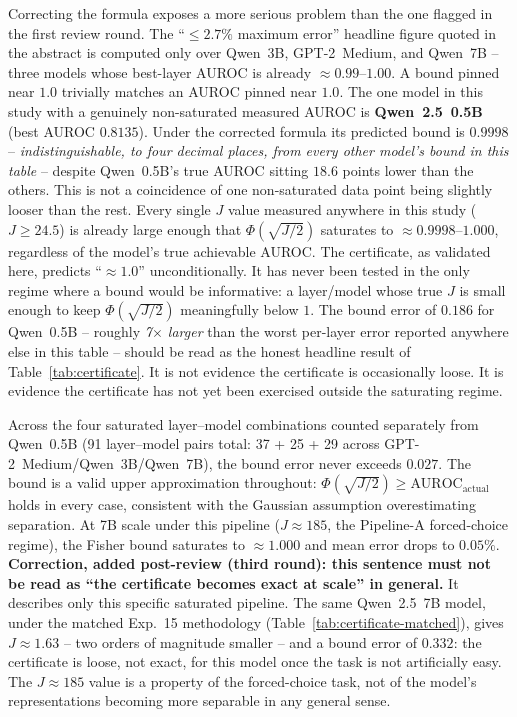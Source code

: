 \documentclass[onecolumn]{jmlr}
\begin{document}
Correcting the formula exposes a more serious problem than the one
flagged in the first review round. The ``$\leq 2.7\%$ maximum error''
headline figure quoted in the abstract is computed only over Qwen~3B,
GPT-2~Medium, and Qwen~7B -- three models whose best-layer AUROC is
already ${\approx}0.99$--$1.00$. A bound pinned near $1.0$ trivially
matches an AUROC pinned near $1.0$. The one model in this study with a
genuinely non-saturated measured AUROC is \textbf{Qwen~2.5~0.5B} (best
AUROC $0.8135$). Under the corrected formula its predicted bound is
$\mathbf{0.9998}$ -- \emph{indistinguishable, to four decimal places,
from every other model's bound in this table} -- despite Qwen~0.5B's
true AUROC sitting $18.6$ points lower than the others. This is not a
coincidence of one non-saturated data point being slightly looser than
the rest. Every single $J$ value measured anywhere in this study
($J \geq 24.5$) is already large enough that $\Phi(\sqrt{J/2})$
saturates to ${\approx}0.9998$--$1.000$, regardless of the model's true
achievable AUROC. The certificate, as validated here, predicts
``${\approx}1.0$'' unconditionally. It has never been tested in the
only regime where a bound would be informative: a layer/model whose
true $J$ is small enough to keep $\Phi(\sqrt{J/2})$ meaningfully below
$1$. The bound error of $\mathbf{0.186}$ for Qwen~0.5B -- roughly
\emph{7$\times$ larger} than the worst per-layer error reported anywhere
else in this table -- should be read as the honest headline result of
Table~\ref{tab:certificate}. It is not evidence the certificate is
occasionally loose. It is evidence the certificate has not yet been
exercised outside the saturating regime.

Across the four saturated layer--model combinations counted separately
from Qwen~0.5B (91 layer--model pairs total: 37 + 25 + 29 across
GPT-2~Medium/Qwen~3B/Qwen~7B), the bound error never exceeds $0.027$.
The bound is a valid upper approximation throughout:
$\Phi(\sqrt{J/2}) \geq \text{AUROC}_\text{actual}$ holds in every case,
consistent with the Gaussian assumption overestimating separation. At 7B
scale under this pipeline ($J \approx 185$, the Pipeline-A forced-choice
regime), the Fisher bound saturates to $\approx 1.000$ and mean error
drops to $0.05\%$. \textbf{Correction, added post-review (third round):
this sentence must not be read as ``the certificate becomes exact at
scale'' in general.} It describes only this specific saturated
pipeline. The same Qwen~2.5~7B model, under the matched Exp.~15
methodology (Table~\ref{tab:certificate-matched}), gives $J \approx
1.63$ -- two orders of magnitude smaller -- and a bound error of
$0.332$: the certificate is loose, not exact, for this model once the
task is not artificially easy. The $J\approx185$ value is a property of
the forced-choice task, not of the model's representations becoming
more separable in any general sense.
\end{document}
